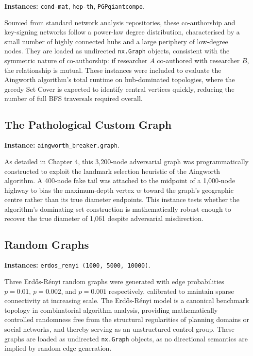 \textbf{Instances:} \texttt{cond-mat}, \texttt{hep-th}, \texttt{PGPgiantcompo}.

Sourced from standard network analysis repositories, these co-authorship and key-signing networks follow a power-law degree distribution, characterised by a small number of highly connected hubs and a large periphery of low-degree nodes. They are loaded as undirected \texttt{nx.Graph} objects, consistent with the symmetric nature of co-authorship: if researcher $A$ co-authored with researcher $B$, the relationship is mutual. These instances were included to evaluate the Aingworth algorithm's total runtime on hub-dominated topologies, where the greedy Set Cover is expected to identify central vertices quickly, reducing the number of full BFS traversals required overall.

\subsection{The Pathological Custom Graph}

\textbf{Instance:} \texttt{aingworth\_breaker.graph}.

As detailed in Chapter 4, this 3,200-node adversarial graph was programmatically constructed to exploit the landmark selection heuristic of the Aingworth algorithm. A 400-node fake tail was attached to the midpoint of a 1,000-node highway to bias the maximum-depth vertex $w$ toward the graph's geographic centre rather than its true diameter endpoints. This instance tests whether the algorithm's dominating set construction is mathematically robust enough to recover the true diameter of 1,061 despite adversarial misdirection.

\subsection{Random Graphs}

\textbf{Instances:} \texttt{erdos\_renyi (1000, 5000, 10000)}.

Three Erdős-Rényi random graphs were generated with edge probabilities $p = 0.01$, $p = 0.002$, and $p = 0.001$ respectively, calibrated to maintain sparse connectivity at increasing scale. The Erdős-Rényi model is a canonical benchmark topology in combinatorial algorithm analysis, providing mathematically controlled randomness free from the structural regularities of planning domains or social networks, and thereby serving as an unstructured control group. These graphs are loaded as undirected \texttt{nx.Graph} objects, as no directional semantics are implied by random edge generation.

